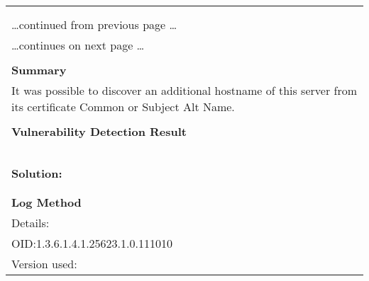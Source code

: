 \documentclass{article}
\begin{document}
\begin{longtable}{|p{}|}
\hline
\rowcolor{gvm_log}{\color{white}{Log (CVSS: 0.0) }}\\
\rowcolor{gvm_log}{\color{white}{NVT: SSL/TLS: Hostname discovery from server certificate}}\\
\hline
\endfirsthead
\hfill\ldots continued from previous page \ldots \\
\hline
\endhead
\hline
\ldots continues on next page \ldots \\
\endfoot
\hline
\endlastfoot
\\
\textbf{Summary}\\
It was possible to discover an additional hostname
  of this server from its certificate Common or Subject Alt Name.\\

        \hline
        \\
\textbf{Vulnerability Detection Result}\\
\rowcolor{white}{\verb=The following additional and resolvable hostnames were detected:=}\\
\rowcolor{white}{\verb=homeprinter=}\\
\rowcolor{white}{\verb=The following additional but not resolvable hostnames were detected:=}\\
\rowcolor{white}{\verb=homeprinter.local=}\\

          \hline
          \\
\textbf{Solution:}\\
\\


        \hline
        \\
\textbf{Log Method}\\
Details:
\rowcolor{white}{\verb=SSL/TLS: Hostname discovery from server certificate=}\\
OID:1.3.6.1.4.1.25623.1.0.111010\\
Version used:
\rowcolor{white}{\verb=2021-11-22T15:32:39Z=}\\
\end{longtable}
\end{document}
